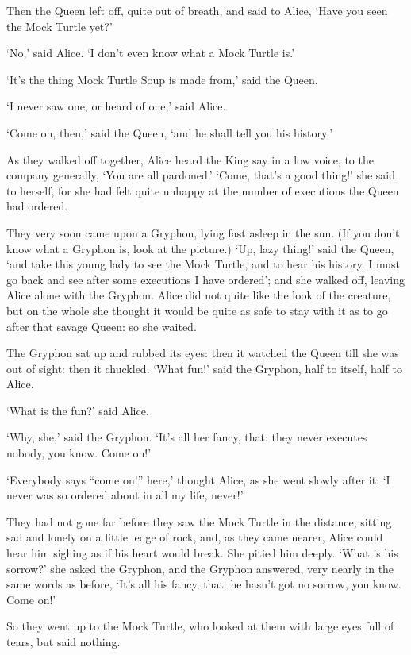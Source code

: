 \documentclass[statementpaper,twoside,openany]{memoir}
\begin{document}
Then the Queen left off, quite out of breath, and said to Alice, `Have you seen the Mock Turtle yet?'

`No,' said Alice. `I don't even know what a Mock Turtle is.'

`It's the thing Mock Turtle Soup is made from,' said the Queen.

`I never saw one, or heard of one,' said Alice.

`Come on, then,' said the Queen, `and he shall tell you his history,'

As they walked off together, Alice heard the King say in a low voice, to the company generally, `You are all pardoned.' `Come, that's a good thing!' she said to herself, for she had felt quite unhappy at the number of executions the Queen had ordered.

They very soon came upon a Gryphon, lying fast asleep in the sun. (If you don't know what a Gryphon is, look at the picture.) `Up, lazy thing!' said the Queen, `and take this young lady to see the Mock Turtle, and to hear his history. I must go back and see after some executions I have ordered'; and she walked off, leaving Alice alone with the Gryphon. Alice did not quite like the look of the creature, but on the whole she thought it would be quite as safe to stay with it as to go after that savage Queen: so she waited.

The Gryphon sat up and rubbed its eyes: then it watched the Queen till she was out of sight: then it chuckled. `What fun!' said the Gryphon, half to itself, half to Alice.

`What is the fun?' said Alice.

`Why, she,' said the Gryphon. `It's all her fancy, that: they never executes nobody, you know. Come on!'

`Everybody says ``come on!'' here,' thought Alice, as she went slowly after it: `I never was so ordered about in all my life, never!'

They had not gone far before they saw the Mock Turtle in the distance, sitting sad and lonely on a little ledge of rock, and, as they came nearer, Alice could hear him sighing as if his heart would break. She pitied him deeply. `What is his sorrow?' she asked the Gryphon, and the Gryphon answered, very nearly in the same words as before, `It's all his fancy, that: he hasn't got no sorrow, you know. Come on!'

So they went up to the Mock Turtle, who looked at them with large eyes full of tears, but said nothing.
\end{document}
